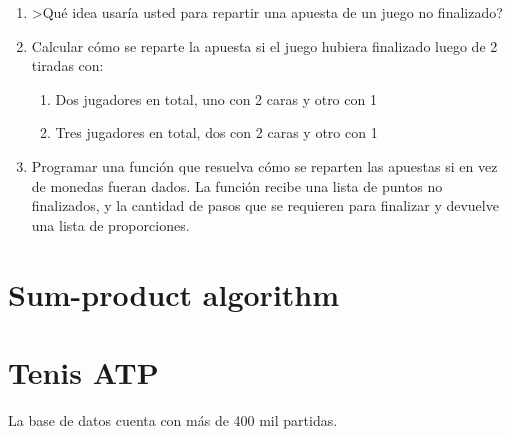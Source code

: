 \documentclass[a4paper,10pt]{article}
\begin{document}
\begin{enumerate}[resume]
 \item >Qué idea usaría usted para repartir una apuesta de un juego no finalizado?
 \item Calcular cómo se reparte la apuesta si el juego hubiera finalizado luego de 2 tiradas con:
 \begin{enumerate}
  \item Dos jugadores en total, uno con 2 caras y otro con 1
  \item Tres jugadores en total, dos con 2 caras y otro con 1
 \end{enumerate}
 \item Programar una función que resuelva cómo se reparten las apuestas si en vez de monedas fueran dados.
 La función recibe una lista de puntos no finalizados, y la cantidad de pasos que se requieren para finalizar y devuelve una lista de proporciones.
\end{enumerate}




\section{Sum-product algorithm}


\section{Tenis ATP} 

La base de datos cuenta con más de 400 mil partidas.
\end{document}
